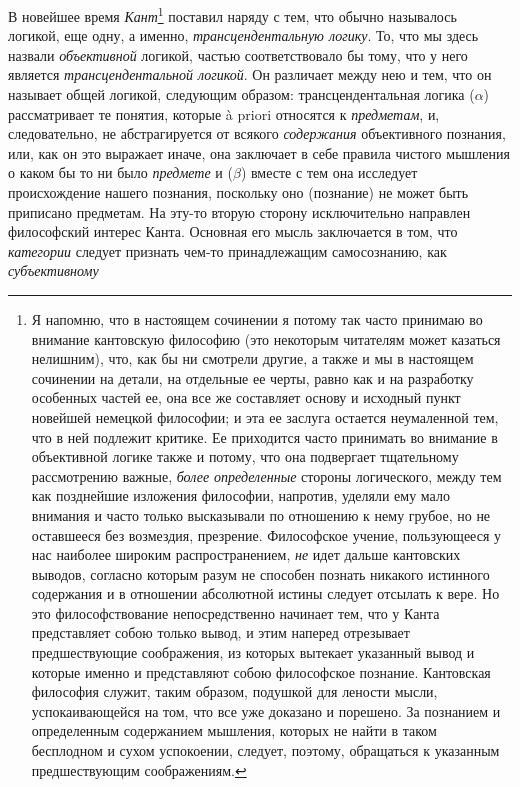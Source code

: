 В новейшее время {\em Кант}\footnote{
Я напомню, что в настоящем сочинении я потому так часто принимаю во
внимание кантовскую философию (это некоторым читателям может казаться
нелишним), что, как бы ни смотрели другие, а также и мы в настоящем
сочинении на детали, на отдельные ее черты, равно как и на разработку
особенных частей ее, она все же составляет основу и исходный пункт новейшей
немецкой философии; и эта ее заслуга остается неумаленной тем, что в ней
подлежит критике. Ее приходится часто принимать во внимание в объективной
логике также и потому, что она подвергает тщательному рассмотрению важные,
{\em более определенные} стороны логического, между тем как
позднейшие изложения философии, напротив, уделяли ему мало внимания и часто
только высказывали по отношению к нему грубое, но не оставшееся без
возмездия, презрение. Философское учение, пользующееся у нас наиболее
широким распространением, {\em не} идет дальше кантовских
выводов, согласно которым разум не способен познать никакого истинного
содержания и в отношении абсолютной истины следует отсылать к вере. Но это
философствование непосредственно начинает тем, что у Канта представляет
собою только вывод, и этим наперед отрезывает предшествующие соображения,
из которых вытекает указанный вывод и которые именно и представляют собою
философское познание. Кантовская философия служит, таким образом, подушкой
для лености мысли, успокаивающейся на том, что все уже доказано и порешено.
За познанием и определенным содержанием мышления, которых не найти в таком
бесплодном и сухом успокоении, следует, поэтому, обращаться к указанным
предшествующим соображениям.} поставил наряду с тем,
что обычно называлось логикой, еще одну, а именно,
{\em трансцендентальную логику}. То, что мы здесь
назвали {\em объективной} логикой, частью
соответствовало бы тому, что у него является
{\em трансцендентальной логикой}. Он различает между
нею и тем, что он называет общей логикой, следующим образом:
трансцендентальная логика ($\alpha$) рассматривает те понятия, которые à
priori относятся к {\em предметам}, и, следовательно,
не абстрагируется от всякого {\em содержания}
объективного познания, или, как он это выражает иначе, она заключает в себе
правила чистого мышления о каком бы то ни было
{\em предмете} и ($\beta$) вместе с тем она исследует
происхождение нашего познания, поскольку оно (познание) не может быть
приписано предметам. На эту-то вторую сторону исключительно направлен
философский интерес Канта. Основная его мысль заключается в том, что
{\em категории} следует признать чем-то принадлежащим
самосознанию, как {\em субъективному}
